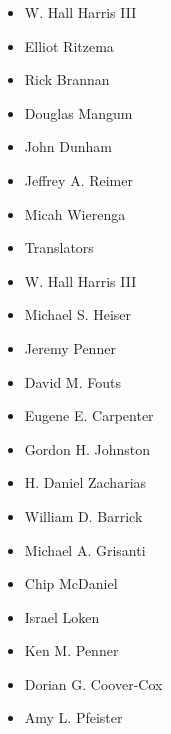 \begin{multicols}{2}
\vspace{-\topsep}
\begin{itemize}
\setlength{\parskip}{0pt} \setlength{\itemsep}{0pt plus 1pt}
    \item W. Hall Harris III
    \item Elliot Ritzema
    \item Rick Brannan
    \item Douglas Mangum
    \item John Dunham
    \item Jeffrey A. Reimer
    \item Micah Wierenga
    \item Translators
    \item W. Hall Harris III
    \item Michael S. Heiser
    \item Jeremy Penner
    \item David M. Fouts
    \item Eugene E. Carpenter
    \item Gordon H. Johnston
    \item H. Daniel Zacharias
    \item William D. Barrick
    \item Michael A. Grisanti
    \item Chip McDaniel
    \item Israel Loken
    \item Ken M. Penner
    \item Dorian G. Coover-Cox
    \item Amy L. Pfeister
\end{itemize}

\vspace{-\topsep}

\end{multicols}

